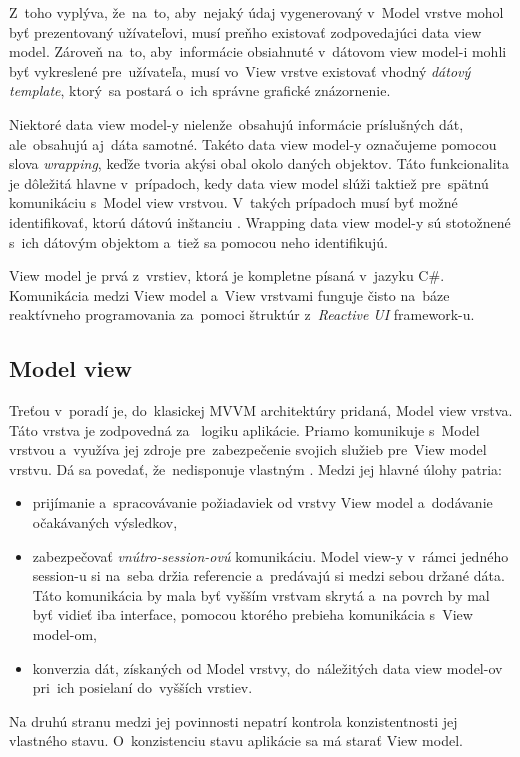 \begin{itemize}
    Z~toho vyplýva, že~na~to, aby~nejaký údaj vygenerovaný v~Model vrstve mohol byť prezentovaný užívateľovi, musí preňho existovať zodpovedajúci data view model. Zároveň na~to, aby~informácie obsiahnuté v~dátovom view model-i mohli byť vykreslené pre~užívateľa, musí vo~View vrstve existovať vhodný \textit{dátový template}, ktorý~sa postará o~ich správne grafické znázornenie.

    Niektoré data view model-y nielenže~obsahujú informácie príslušných dát, ale~obsahujú aj~dáta samotné. Takéto data view model-y označujeme pomocou slova \textit{wrapping}, keďže tvoria akýsi obal okolo daných objektov. Táto funkcionalita je dôležitá hlavne v~prípadoch, kedy data view model slúži taktiež pre~spätnú komunikáciu s~Model view vrstvou. V~takých prípadoch musí byť možné identifikovať, ktorú dátovú inštanciu . Wrapping data view model-y sú stotožnené s~ich dátovým objektom a~tiež sa pomocou neho identifikujú.  
\end{itemize}


View model je prvá z~vrstiev, ktorá je kompletne písaná v~jazyku C\#. Komunikácia medzi View model a~View vrstvami funguje čisto na~báze reaktívneho programovania za~pomoci štruktúr z~\textit{Reactive UI} framework-u.  

\subsection{Model view}

Treťou v~poradí je, do~klasickej MVVM architektúry pridaná, Model view vrstva. Táto vrstva je zodpovedná za~ logiku aplikácie. Priamo komunikuje s~Model vrstvou a~využíva jej zdroje pre~zabezpečenie svojich služieb pre~View model vrstvu. Dá sa povedať, že~nedisponuje vlastným . Medzi jej hlavné úlohy patria:  
\begin{itemize}
    \item prijímanie a~spracovávanie požiadaviek od vrstvy View model a~dodávanie očakávaných výsledkov,
    \item zabezpečovať \textit{vnútro-session-ovú} komunikáciu. Model view-y v~rámci jedného session-u si na~seba držia referencie a~predávajú si medzi sebou držané dáta. Táto komunikácia by mala byť vyšším vrstvam skrytá a~na povrch by mal byť vidieť iba interface, pomocou ktorého prebieha komunikácia s~View model-om,
    \item konverzia dát, získaných od Model vrstvy, do~náležitých data view model-ov pri~ich posielaní do~vyšších vrstiev. 
\end{itemize}
Na druhú stranu medzi jej povinnosti nepatrí kontrola konzistentnosti jej vlastného stavu. O~konzistenciu stavu aplikácie sa má starať View model.

